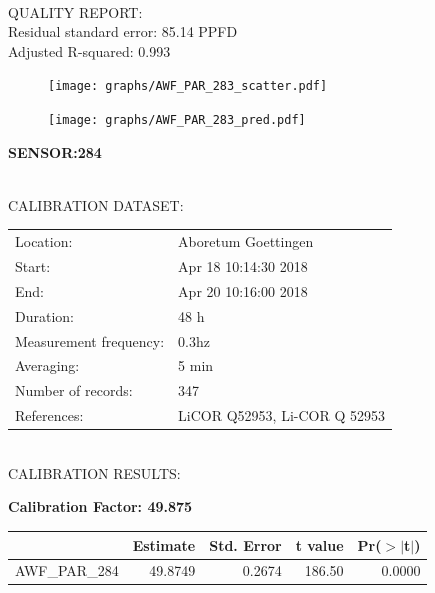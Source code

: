 \documentclass[oneside]{report}
\begin{document}
\hrulefill\\
QUALITY REPORT:\\
Residual standard error: 85.14 PPFD\\
Adjusted R-squared: 0.993



\begin{figure}[H]
  \centering
  \texttt{[image: graphs/AWF\_PAR\_283\_scatter.pdf]}
\end{figure}




\begin{figure}[H]
  \centering
  \texttt{[image: graphs/AWF\_PAR\_283\_pred.pdf]}
\end{figure}

\pagebreak


\begin{center}
\large{\textbf{SENSOR:284}}\\
\end{center}

\hrulefill\\
CALIBRATION DATASET:\\
\begin{table}[h!]
  \centering
  \label{tab:table1}
  \begin{tabular}{ll}
    Location: & Aboretum Goettingen\\ 
    
    
    Start:  & Apr 18 10:14:30 2018 \\
    End:   & Apr 20 10:16:00 2018\\ 
    Duration: & 48 h\\
    Measurement frequency: & 0.3hz\\
    Averaging:  &5 min\\
    Number of records: & 347 \\
    References: & LiCOR Q52953, Li-COR Q 52953 \\
  \end{tabular}
\end{table}

\hrulefill\\
CALIBRATION RESULTS:\\


\begin{center}
\textbf{\large{Calibration Factor: 49.875}}\\
\end{center}
\begin{table}[ht]
\centering
\begin{tabular}{rrrrr}
  \hline
 & Estimate & Std. Error & t value & Pr($>$$|$t$|$) \\ 
  \hline
AWF\_PAR\_284 & 49.8749 & 0.2674 & 186.50 & 0.0000 \\ 
   \hline
\end{tabular}
\end{table}
\end{document}
